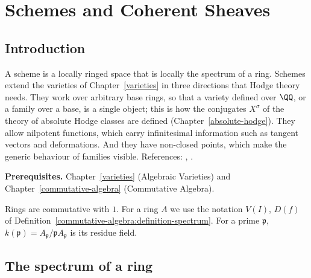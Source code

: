 \chapter{Schemes and Coherent Sheaves}\label{schemes}

\section{Introduction}\label{schemes:section-introduction}

A scheme is a locally ringed space that is locally the spectrum of a ring. Schemes extend the varieties of Chapter~\ref{varieties} in three
directions that Hodge theory needs. They work over arbitrary base rings, so that a variety defined over $\QQ$, or a family over a base, is a single
object; this is how the conjugates $X^\sigma$ of the theory of absolute Hodge classes are defined (Chapter~\ref{absolute-hodge}). They allow nilpotent
functions, which carry infinitesimal information such as tangent vectors and deformations. And they have non-closed points, which make the
generic behaviour of families visible. References: \cite[Chapter II]{hartshorne-ag}, \cite{stacks-project}.

\noindent\textbf{Prerequisites.} Chapter~\ref{varieties} (Algebraic Varieties) and Chapter~\ref{commutative-algebra} (Commutative Algebra).

Rings are commutative with $1$. For a ring $A$ we use the notation $V(I)$, $D(f)$ of Definition~\ref{commutative-algebra:definition-spectrum}.
For a prime $\mathfrak{p}$, $k(\mathfrak{p}) = A_\mathfrak{p}/\mathfrak{p}A_\mathfrak{p}$ is its residue field.

\section{The spectrum of a ring}\label{schemes:section-spectrum}

